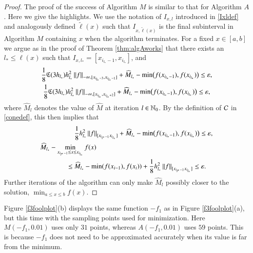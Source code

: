 \documentclass[review]{elsarticle}
\newcommand{\abstol}{\varepsilon}
\theoremstyle{definition}
\newcommand{\tell}{\tilde{\ell}}
\newcommand{\hM}{\widehat{M}}
\newcommand{\minfii}{\min(f(x_{i-1}), f(x_i))} %
\begin{document}
\begin{proof}
	The proof of the success of Algorithm $M$ is similar to that for Algorithm $A$. Here 
	we give the highlights.     We use the notation of $I_{x,l}$ introduced in \eqref{Ixldef} 
	and analogously defined $\tell(x)$ such that $I_{x,\tell(x)}$ is the final subinterval in 
	Algorithm $M$ containing $x$ when the algorithm terminates.   For a fixed $x \in 
	[a,b]$ we argue as in the proof of Theorem \ref{thm:algAworks} that there exists an 
	$l_{*} \le \ell(x)$ such that $I_{x,l_*} =[x_{i_{l_*}-1},x_{i_{l_*}}]$, and
	\begin{gather*}
	\frac{1} 8 \fC(3h_{l_*}) h_{l_*}^2 \norm[-\infty,{[x_{i_{l_*}-3},x_{i_{l_*}-1}]}]{f} + \hM_{l_*} 
	-  \min\bigl(f(x_{i_{l_*}-1}),f(x_{i_{l_*}})\bigr)   \le \abstol , \\
	\frac{1} 8 \fC(3h_{l_*}) h_{l_*}^2 \norm[-\infty,{[x_{i_{l_*}},x_{i_{l_*}+2}]}]{f} +  \hM_{l_*} 
	-  \min\bigl(f(x_{i_{l_*}-1}),f(x_{i_{l_*}})\bigr)   \le \abstol,
	\end{gather*}
	where $ \hM_{l}$ denotes the value of $\hM$ at iteration $l \in \mathbb{N}_{0}$.  By the 
	definition of $\mathcal{C}$ in \eqref{conedef}, this then implies that
	\begin{align}
	\nonumber
	 &	\frac{1}{8} h_{l_*}^2 \norm[{[x_{i_{l^*}-1} x_{i_{l_*}}]}]{f} + \hM_{l_*} -  
	 \min\bigl(f(x_{i_{l_*}-1}),f(x_{i_{l_*}})\bigr)   \le \abstol, 
	\\	\MoveEqLeft[5]{\hM_{l_*} - \min_{x_{i_{l^*}-1} \le x \le x_{i_{l_*}}} f(x) } \nonumber
	\\ \le \ & \hM_{l_*}  - \minfii + \frac{1}{8} h_{l_*}^2\norm[{[x_{i_{l^*}-1} x_{i_{l_*}}]}]{f} \le  
	\abstol. \label{herrtogether}
	\end{align}
Further iterations of the algorithm can only make $\hM_{l}$ possibly closer to the 
solution, $\min_{a \le x \le b} f(x) $.
\end{proof}

Figure \ref{f3foolplot}(b) displays the same function $-f_1$ as in
Figure \ref{f3foolplot}(a), but this time with the sampling points used for
minimization. Here $M(-f_1,0.01)$ uses only $31$ points, whereas
$A(-f_1,0.01)$ uses $59$ points. This is because $-f_1$ does not need to be
approximated accurately when its value is far from the minimum.
\end{document}

